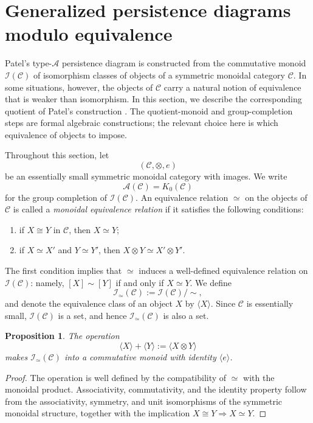 \documentclass{amsart}
\newtheorem{proposition}[theorem]{Proposition}
\begin{document}
\section{Generalized persistence diagrams modulo equivalence}
\label{sec:persistence-modulo-equivalence}

Patel's type-$\mathcal{A}$ persistence diagram is constructed from the
commutative monoid $\mathcal{I}(\mathcal{C})$ of isomorphism classes
of objects of a symmetric monoidal category $\mathcal{C}$. In some
situations, however, the objects of $\mathcal{C}$ carry a natural
notion of equivalence that is weaker than isomorphism. In this section,
we describe the corresponding quotient of Patel's construction \cite[Sections~6.1 and 7]{patel2016generalized}. The quotient-monoid and group-completion steps are formal algebraic constructions; the relevant choice here is which equivalence of objects to impose.

Throughout this section, let
\[
(\mathcal{C},\otimes,e)
\]
be an essentially small symmetric monoidal category with images. We
write
\[
\mathcal{A}(\mathcal{C})=K_0(\mathcal{C})
\]
for the group completion of $\mathcal{I}(\mathcal{C})$. An equivalence relation $\simeq$ on the objects of $\mathcal{C}$ is
called a \textit{monoidal equivalence relation} if it satisfies the
following conditions:
\begin{enumerate}
    \item[{\rm(i).}] if $X\cong Y$ in $\mathcal{C}$, then $X\simeq Y$;
    \item[{\rm(ii).}] if $X\simeq X'$ and $Y\simeq Y'$, then $X\otimes Y\simeq X'\otimes Y'.$
\end{enumerate}
The first condition implies that $\simeq$ induces a well-defined
equivalence relation on $\mathcal{I}(\mathcal{C})$: namely,
$[X]\sim[Y]$ if and only if  $X\simeq Y.$ We define
\[
\mathcal{I}_{\simeq}(\mathcal{C})
:=
\mathcal{I}(\mathcal{C})/{\sim},
\]
and denote the equivalence class of an object $X$ by
$\langle X\rangle$. Since $\mathcal{C}$ is essentially small,
$\mathcal{I}(\mathcal{C})$ is a set, and hence
$\mathcal{I}_{\simeq}(\mathcal{C})$ is also a set.

\begin{proposition}
The operation
\[
\langle X\rangle+\langle Y\rangle
:=
\langle X\otimes Y\rangle
\]
makes $\mathcal{I}_{\simeq}(\mathcal{C})$ into a commutative monoid
with identity $\langle e\rangle$.
\end{proposition}

\begin{proof}
The operation is well defined by the compatibility of $\simeq$ with
the monoidal product. Associativity, commutativity, and the identity
property follow from the associativity, symmetry, and unit
isomorphisms of the symmetric monoidal structure, together with the
implication $X\cong Y\Longrightarrow X\simeq Y.$
\end{proof}
\end{document}
